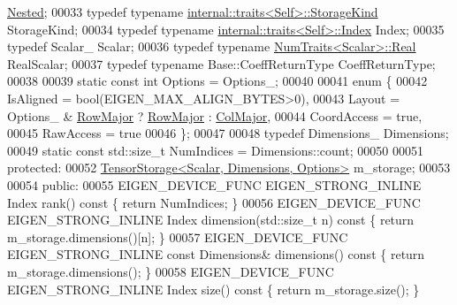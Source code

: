 \begin{DoxyCode}
      \hyperlink{class_eigen_1_1internal_1_1_tensor_lazy_evaluator_writable}{Nested};
00033     \textcolor{keyword}{typedef} \textcolor{keyword}{typename} \hyperlink{struct_eigen_1_1internal_1_1traits}{internal::traits<Self>::StorageKind} StorageKind;
00034     \textcolor{keyword}{typedef} \textcolor{keyword}{typename} \hyperlink{struct_eigen_1_1internal_1_1traits}{internal::traits<Self>::Index} Index;
00035     \textcolor{keyword}{typedef} Scalar\_ Scalar;
00036     \textcolor{keyword}{typedef} \textcolor{keyword}{typename} \hyperlink{group___core___module_struct_eigen_1_1_num_traits}{NumTraits<Scalar>::Real} RealScalar;
00037     \textcolor{keyword}{typedef} \textcolor{keyword}{typename} Base::CoeffReturnType CoeffReturnType;
00038 
00039     \textcolor{keyword}{static} \textcolor{keyword}{const} \textcolor{keywordtype}{int} Options = Options\_;
00040 
00041     \textcolor{keyword}{enum} \{
00042       IsAligned = bool(EIGEN\_MAX\_ALIGN\_BYTES>0),
00043       Layout = Options\_ & \hyperlink{group__enums_ggaacded1a18ae58b0f554751f6cdf9eb13acfcde9cd8677c5f7caf6bd603666aae3}{RowMajor} ? \hyperlink{group__enums_ggaacded1a18ae58b0f554751f6cdf9eb13acfcde9cd8677c5f7caf6bd603666aae3}{RowMajor} : \hyperlink{group__enums_ggaacded1a18ae58b0f554751f6cdf9eb13a0cbd4bdd0abcfc0224c5fcb5e4f6669a}{ColMajor},
00044       CoordAccess = \textcolor{keyword}{true},
00045       RawAccess = \textcolor{keyword}{true}
00046     \};
00047 
00048   \textcolor{keyword}{typedef} Dimensions\_ Dimensions;
00049   \textcolor{keyword}{static} \textcolor{keyword}{const} std::size\_t NumIndices = Dimensions::count;
00050 
00051   \textcolor{keyword}{protected}:
00052   \hyperlink{class_eigen_1_1_tensor_storage}{TensorStorage<Scalar, Dimensions, Options>} m\_storage;
00053 
00054   \textcolor{keyword}{public}:
00055     EIGEN\_DEVICE\_FUNC EIGEN\_STRONG\_INLINE Index                    rank()\textcolor{keyword}{                   const }\{ \textcolor{keywordflow}{return} 
      NumIndices; \}
00056     EIGEN\_DEVICE\_FUNC EIGEN\_STRONG\_INLINE Index                    dimension(std::size\_t n)\textcolor{keyword}{ const }\{ \textcolor{keywordflow}{return} 
      m\_storage.dimensions()[n]; \}
00057     EIGEN\_DEVICE\_FUNC EIGEN\_STRONG\_INLINE \textcolor{keyword}{const} Dimensions&        dimensions()\textcolor{keyword}{             const }\{ \textcolor{keywordflow}{return} 
      m\_storage.dimensions(); \}
00058     EIGEN\_DEVICE\_FUNC EIGEN\_STRONG\_INLINE Index                    size()\textcolor{keyword}{                   const }\{ \textcolor{keywordflow}{return} 
      m\_storage.size(); \}

\end{DoxyCode}
